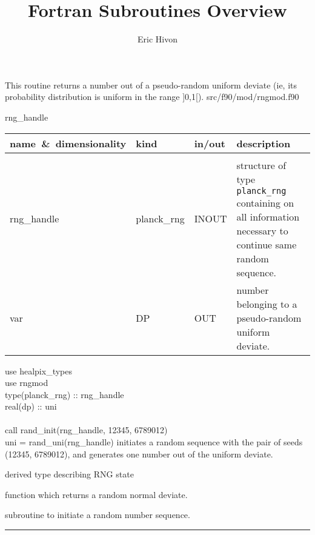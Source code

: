 
\sloppy


\title{\healpix Fortran Subroutines Overview}
 \section[rand\_uni]{ }
\label{sub:rand_uni}
\author{Eric Hivon}

\begin{facility}
{This routine returns a number out of a pseudo-random uniform deviate (ie, its
  probability distribution is uniform in the range ]0,1[).
}
{src/f90/mod/rngmod.f90}
\end{facility}

\begin{f90function}
{rng\_handle}
\end{f90function}

\begin{arguments}
{
\begin{tabular}{p{0.3\hsize} p{0.15\hsize} p{0.1\hsize} p{0.35\hsize}} \hline  
\textbf{name~\&~dimensionality} & \textbf{kind} & \textbf{in/out} & \textbf{description} \\ \hline
                   &   &   &                           \\ %
rng\_handle & planck\_rng & INOUT & structure of type {\tt planck\_rng}
                   containing on all information necessary to continue same
                   random sequence. \\ 
var & DP & OUT & number belonging to a pseudo-random uniform deviate.
\end{tabular}
}
\end{arguments}

\begin{example}
{
use healpix\_types \\
use rngmod \\
type(planck\_rng) :: rng\_handle \\
real(dp) :: uni \\
\\
call rand\_init(rng\_handle, 12345, 6789012)  \\
uni = rand\_uni(rng\_handle)
}
{
initiates a random sequence with the pair of seeds (12345, 6789012), and
generates one number out of the uniform deviate.
}
\end{example}

\begin{related}
  \begin{sulist}{} %
  \item[\htmlref{planck\_rng}{sub:planck_rng}] derived type describing RNG state
  \item[\htmlref{rand\_gauss}{sub:rand_gauss}] function which returns a  random normal deviate.
  \item[\htmlref{rand\_init}{sub:rand_init}] subroutine to initiate a random number sequence. 
  \end{sulist}
\end{related}

\rule{\hsize}{2mm}

\newpage

